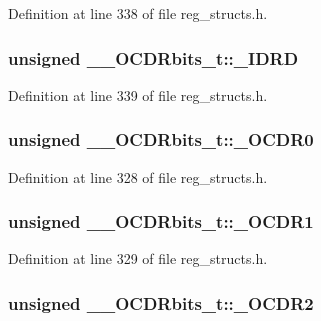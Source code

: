 Definition at line 338 of file reg\+\_\+structs.\+h.

\hypertarget{union_____o_c_d_rbits__t_ae9beda5d199ad64fc1333c6cac66d172}{
\subsubsection[{\+\_\+\+I\+D\+R\+D}]{\setlength{\rightskip}{0pt plus 5cm}unsigned \+\_\+\+\_\+\+O\+C\+D\+Rbits\+\_\+t\+::\+\_\+\+I\+D\+R\+D}}\label{union_____o_c_d_rbits__t_ae9beda5d199ad64fc1333c6cac66d172}


Definition at line 339 of file reg\+\_\+structs.\+h.

\hypertarget{union_____o_c_d_rbits__t_a83a444463e5696bd01f6e06196136f9c}{
\subsubsection[{\+\_\+\+O\+C\+D\+R0}]{\setlength{\rightskip}{0pt plus 5cm}unsigned \+\_\+\+\_\+\+O\+C\+D\+Rbits\+\_\+t\+::\+\_\+\+O\+C\+D\+R0}}\label{union_____o_c_d_rbits__t_a83a444463e5696bd01f6e06196136f9c}


Definition at line 328 of file reg\+\_\+structs.\+h.

\hypertarget{union_____o_c_d_rbits__t_ab6d5ff0ffcee71db3a14328efe3068da}{
\subsubsection[{\+\_\+\+O\+C\+D\+R1}]{\setlength{\rightskip}{0pt plus 5cm}unsigned \+\_\+\+\_\+\+O\+C\+D\+Rbits\+\_\+t\+::\+\_\+\+O\+C\+D\+R1}}\label{union_____o_c_d_rbits__t_ab6d5ff0ffcee71db3a14328efe3068da}


Definition at line 329 of file reg\+\_\+structs.\+h.

\hypertarget{union_____o_c_d_rbits__t_ad0fb3580034f40ff9813d7ad89250513}{
\subsubsection[{\+\_\+\+O\+C\+D\+R2}]{\setlength{\rightskip}{0pt plus 5cm}unsigned \+\_\+\+\_\+\+O\+C\+D\+Rbits\+\_\+t\+::\+\_\+\+O\+C\+D\+R2}}\label{union_____o_c_d_rbits__t_ad0fb3580034f40ff9813d7ad89250513}


